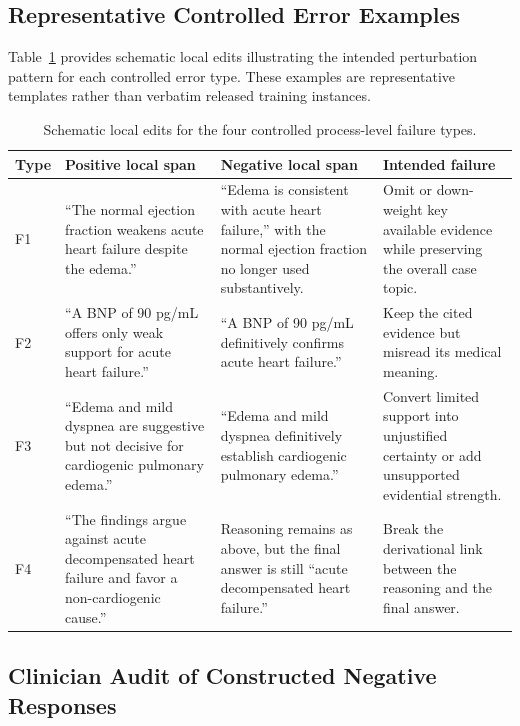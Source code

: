 \documentclass[a4paper,fleqn,doubleblind]{cas-sc}
\begin{document}
\subsection{Representative Controlled Error Examples}
\label{app:negative_examples}

Table~\ref{tab:negative_examples} provides schematic local edits illustrating the intended perturbation pattern for each controlled error type. These examples are representative templates rather than verbatim released training instances.

\begin{table}[htbp]
    \centering
    \caption{Schematic local edits for the four controlled process-level failure types.}
    \label{tab:negative_examples}
    \begin{tabular}{p{}p{}p{}p{}}
        \toprule
        \textbf{Type} & \textbf{Positive local span} & \textbf{Negative local span} & \textbf{Intended failure} \\
        \midrule
        F1 & ``The normal ejection fraction weakens acute heart failure despite the edema.'' & ``Edema is consistent with acute heart failure,'' with the normal ejection fraction no longer used substantively. & Omit or down-weight key available evidence while preserving the overall case topic. \\
        F2 & ``A BNP of 90 pg/mL offers only weak support for acute heart failure.'' & ``A BNP of 90 pg/mL definitively confirms acute heart failure.'' & Keep the cited evidence but misread its medical meaning. \\
        F3 & ``Edema and mild dyspnea are suggestive but not decisive for cardiogenic pulmonary edema.'' & ``Edema and mild dyspnea definitively establish cardiogenic pulmonary edema.'' & Convert limited support into unjustified certainty or add unsupported evidential strength. \\
        F4 & ``The findings argue against acute decompensated heart failure and favor a non-cardiogenic cause.'' & Reasoning remains as above, but the final answer is still ``acute decompensated heart failure.'' & Break the derivational link between the reasoning and the final answer. \\
        \bottomrule
    \end{tabular}
\end{table}

\subsection{Clinician Audit of Constructed Negative Responses}
\label{app:negative_audit_details}
\end{document}
